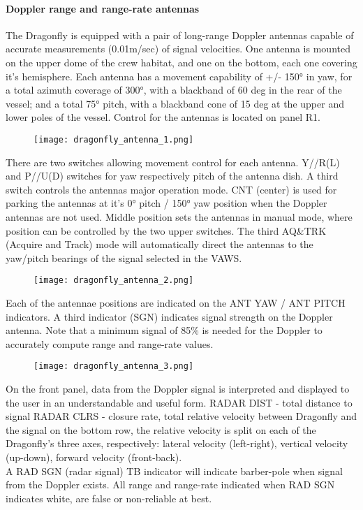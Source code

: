 \documentclass[Orbiter User Manual.tex]{subfiles}
\begin{document}
\paragraph{Doppler range and range-rate antennas}
The Dragonfly is equipped with a pair of long-range Doppler antennas capable of accurate measurements (0.01m/sec) of signal velocities. One antenna is mounted on the upper dome of the crew habitat, and one on the bottom, each one covering it's hemisphere. Each antenna has a movement capability of +/- 150° in yaw, for a total azimuth coverage of 300°, with a blackband of 60 deg in the rear of the vessel; and a total 75° pitch, with a blackband cone of 15 deg at the upper and lower poles of the vessel. Control for the antennas is located on panel R1.

\begin{figure}[H]
  \centering
  \texttt{[image: dragonfly\_antenna\_1.png]}
\end{figure}

\noindent
There are two switches allowing movement control for each antenna. Y//R(L) and P//U(D) switches for yaw respectively pitch of the antenna dish. A third switch controls the antennas major operation mode. CNT (center) is used for parking the antennas at it's 0° pitch / 150° yaw position when the Doppler antennas are not used. Middle position sets the antennas in manual mode, where position can be controlled by the two upper switches. The third AQ\&TRK (Acquire and Track) mode will automatically direct the antennas to the yaw/pitch bearings of the signal selected in the VAWS.

\begin{figure}[H]
  \centering
  \texttt{[image: dragonfly\_antenna\_2.png]}
\end{figure}

\noindent
Each of the antennae positions are indicated on the ANT YAW / ANT PITCH indicators. A third indicator (SGN) indicates signal strength on the Doppler antenna. Note that a minimum signal of 85\% is needed for the Doppler to accurately compute range and range-rate values.

\begin{figure}[H]
  \centering
  \texttt{[image: dragonfly\_antenna\_3.png]}
\end{figure}

\noindent
On the front panel, data from the Doppler signal is interpreted and displayed to the user in an understandable and useful form. RADAR DIST - total distance to signal RADAR CLRS - closure rate, total relative velocity between Dragonfly and the signal on the bottom row, the relative velocity is split on each of the Dragonfly's three axes, respectively: lateral velocity (left-right), vertical velocity (up-down), forward velocity (front-back).\\
A RAD SGN (radar signal) TB indicator will indicate barber-pole when signal from the Doppler exists. All range and range-rate indicated when RAD SGN indicates white, are false or non-reliable at best.
\end{document}
